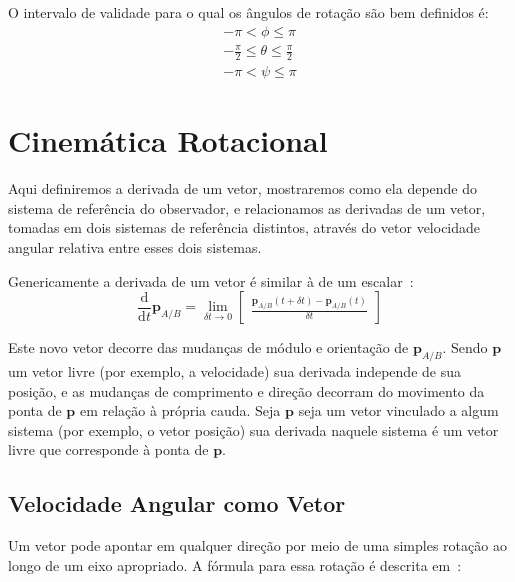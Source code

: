 O intervalo de validade para o qual os ângulos de rotação são bem definidos\footnotemark{} é:
\begin{align*}
    -\pi  < \phi \leq \pi \\
    -\frac{\pi}{2} \leq \theta \leq \frac{\pi}{2} \\
    -\pi < \psi \leq \pi
\end{align*}


\section{Cinemática Rotacional}

Aqui definiremos a derivada de um vetor, mostraremos como ela depende do sistema de referência do observador, e relacionamos as derivadas de um vetor, tomadas em dois sistemas de referência distintos, através do vetor velocidade angular relativa entre esses dois sistemas.

Genericamente a derivada de um vetor é similar à de um escalar~\cite{Stevens2016}:
\begin{equation*}
    \frac{\mathrm{d}}{\mathrm{d}t} \mathbf{p}_{A/B} =  \lim_{\delta t \rightarrow 0 } \begin{bmatrix}
        \displaystyle\frac{\mathbf{p}_{A/B} (t + \delta t) - \mathbf{p}_{A/B} (t) }{\delta t}
    \end{bmatrix}
\end{equation*}

Este novo vetor decorre das mudanças de módulo e orientação de \(\mathbf{p}_{A/B}\). Sendo \(\mathbf{p}\) um vetor livre (por exemplo, a velocidade) sua derivada independe de sua posição, e as mudanças de comprimento e direção decorram do movimento da ponta de \(\mathbf{p}\) em relação à própria cauda. Seja \(\mathbf{p}\) seja um vetor vinculado a algum sistema (por exemplo, o vetor posição) sua derivada naquele sistema é um vetor livre que corresponde à ponta de \(\mathbf{p}\).

\subsection{Velocidade Angular como Vetor}

Um vetor pode apontar em qualquer direção por meio de uma simples rotação ao longo de um eixo apropriado. A fórmula para essa rotação é descrita em~\cite{Goldstein1980}:

